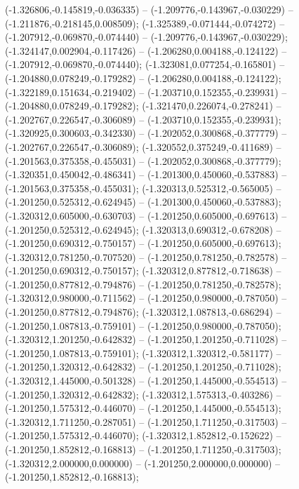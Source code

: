  (-1.326806,-0.145819,-0.036335) -- (-1.209776,-0.143967,-0.030229) -- (-1.211876,-0.218145,0.008509);
 (-1.325389,-0.071444,-0.074272) -- (-1.207912,-0.069870,-0.074440) -- (-1.209776,-0.143967,-0.030229);
 (-1.324147,0.002904,-0.117426) -- (-1.206280,0.004188,-0.124122) -- (-1.207912,-0.069870,-0.074440);
 (-1.323081,0.077254,-0.165801) -- (-1.204880,0.078249,-0.179282) -- (-1.206280,0.004188,-0.124122);
 (-1.322189,0.151634,-0.219402) -- (-1.203710,0.152355,-0.239931) -- (-1.204880,0.078249,-0.179282);
 (-1.321470,0.226074,-0.278241) -- (-1.202767,0.226547,-0.306089) -- (-1.203710,0.152355,-0.239931);
 (-1.320925,0.300603,-0.342330) -- (-1.202052,0.300868,-0.377779) -- (-1.202767,0.226547,-0.306089);
 (-1.320552,0.375249,-0.411689) -- (-1.201563,0.375358,-0.455031) -- (-1.202052,0.300868,-0.377779);
 (-1.320351,0.450042,-0.486341) -- (-1.201300,0.450060,-0.537883) -- (-1.201563,0.375358,-0.455031);
 (-1.320313,0.525312,-0.565005) -- (-1.201250,0.525312,-0.624945) -- (-1.201300,0.450060,-0.537883);
 (-1.320312,0.605000,-0.630703) -- (-1.201250,0.605000,-0.697613) -- (-1.201250,0.525312,-0.624945);
 (-1.320313,0.690312,-0.678208) -- (-1.201250,0.690312,-0.750157) -- (-1.201250,0.605000,-0.697613);
 (-1.320312,0.781250,-0.707520) -- (-1.201250,0.781250,-0.782578) -- (-1.201250,0.690312,-0.750157);
 (-1.320312,0.877812,-0.718638) -- (-1.201250,0.877812,-0.794876) -- (-1.201250,0.781250,-0.782578);
 (-1.320312,0.980000,-0.711562) -- (-1.201250,0.980000,-0.787050) -- (-1.201250,0.877812,-0.794876);
 (-1.320312,1.087813,-0.686294) -- (-1.201250,1.087813,-0.759101) -- (-1.201250,0.980000,-0.787050);
 (-1.320312,1.201250,-0.642832) -- (-1.201250,1.201250,-0.711028) -- (-1.201250,1.087813,-0.759101);
 (-1.320312,1.320312,-0.581177) -- (-1.201250,1.320312,-0.642832) -- (-1.201250,1.201250,-0.711028);
 (-1.320312,1.445000,-0.501328) -- (-1.201250,1.445000,-0.554513) -- (-1.201250,1.320312,-0.642832);
 (-1.320312,1.575313,-0.403286) -- (-1.201250,1.575312,-0.446070) -- (-1.201250,1.445000,-0.554513);
 (-1.320312,1.711250,-0.287051) -- (-1.201250,1.711250,-0.317503) -- (-1.201250,1.575312,-0.446070);
 (-1.320312,1.852812,-0.152622) -- (-1.201250,1.852812,-0.168813) -- (-1.201250,1.711250,-0.317503);
 (-1.320312,2.000000,0.000000) -- (-1.201250,2.000000,0.000000) -- (-1.201250,1.852812,-0.168813);

